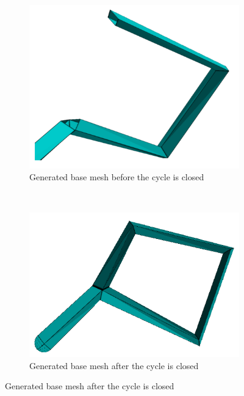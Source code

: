 \begin{figure}[ht]
        \\ %
        \begin{subfigure}[b]{0.4\linewidth}
        \centering
			\includegraphics[width=0.9\linewidth]{images/cyclic_skeletons_3}
            \caption{Generated base mesh before the cycle is closed}
            \label{fig:cycle_before}
        \end{subfigure}
        ~ %
        \begin{subfigure}[b]{0.4\linewidth}
        \centering
			\includegraphics[width=0.9\linewidth]{images/cyclic_skeletons_4}
            \caption{Generated base mesh after the cycle is closed}
            \label{fig:cycle_after}

\end{subfigure}
\end{figure}
